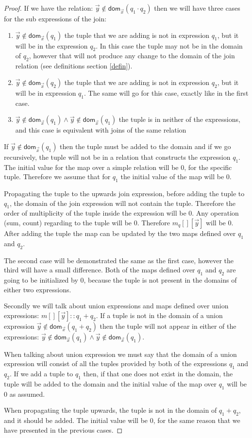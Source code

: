 \documentclass[12pt]{article}
\newcommand{\dom}{\textsf{dom}}
\begin{document}
\begin{proof}
If we have the relation: $\vec{y}\notin\dom{}_{\vec{x}}(q_1\cdot q_2)$ then we will have three cases for the sub expressions of the join:
\begin{enumerate}
\item $\vec{y}\notin\dom{}_{\vec{x}}(q_1)$ the tuple that we are adding is not in expression $q_1$, but it will be in the expression $q_2$. In this case the tuple may not be in the domain of $q_2$, however that will not produce any change to the domain of the join relation (see definitions section \ref{defin}).
\item $\vec{y}\notin\dom{}_{\vec{x}}(q_2)$ the tuple that we are adding is not in expression $q_2$, but it will be in expression $q_1$. The same will go for this case, exactly like in the first case.
\item $\vec{y}\notin\dom{}_{\vec{x}}(q_1)\land \vec{y}\notin\dom{}_{\vec{x}}(q_1)$ the tuple is in neither of the expressions, and this case is equivalent with joins of the same relation 
\end{enumerate}

If $\vec{y}\notin\dom{}_{\vec{x}}(q_1)$ then the tuple must be added to the domain and if we go recursively, the tuple will not be in a relation that constructs the expression $q_1$. The initial value for the map over a simple relation will be 0, for the specific tuple. Therefore we assume that for $q_1$ the initial value of the map will be 0. 

Propagating the tuple to the upwards join expression, before adding the tuple to $q_1$, the domain of the join expression will not contain the tuple. Therefore the order of multiplicity of the tuple inside the expression will be 0. Any operation (sum, count) regarding to the tuple will be 0. Therefore $m_q[][\vec{y}]$ will be 0. After adding the tuple the map can be updated by the two maps defined over $q_1$ and $q_2$.

The second case will be demonstrated the same as the first case, however the third will have a small difference. Both of the maps defined over $q_1$ and $q_2$ are going to be initialized by 0, because the tuple is not present in the domains of either two expressions.

Secondly we will talk about union expressions and maps defined over union expressions: $m[][\vec{y}]::q_1+q_2$. If a tuple is not in the domain of a union expression $\vec{y}\notin\dom{}_{\vec{x}}(q_1+q_2)$ then the tuple will not appear in either of the expressions: $\vec{y}\notin\dom{}_{\vec{x}}(q_1)\land \vec{y}\notin\dom{}_{\vec{x}}(q_1)$.

When talking about union expression we must say that the domain of a union expression will consist of all the tuples provided by both of the expressions $q_1$ and $q_2$. If we add a tuple to $q_1$ then, if that one does not exist in the domain, the tuple will be added to the domain and the initial value of the map over $q_1$ will be 0 as assumed.

When propagating the tuple upwards, the tuple is not in the domain of $q_1+q_2$, and it should be added. The initial value will be 0, for the same reason that we have presented in the previous cases.
\end{proof}
\end{document}
